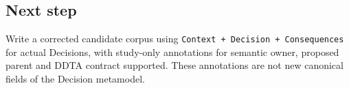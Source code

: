 \documentclass[
  10pt,
  a4paper,
]{article}
\begin{document}
\subsection{Next step}\label{next-step}

Write a corrected candidate corpus using
\texttt{Context\ +\ Decision\ +\ Consequences} for actual Decisions,
with study-only annotations for semantic owner, proposed parent and DDTA
contract supported. These annotations are not new canonical fields of
the Decision metamodel.
\end{document}
